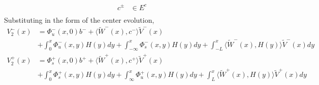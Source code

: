 \documentclass[thesis.tex]{subfiles}
\begin{document}
\begin{enumerate}
\begin{align*}
c^\pm &\in E^c \\
\end{align*}
Substituting in the form of the center evolution,
\begin{equation*}
\begin{aligned}
V_2^-(x) &= \Phi_u^-(x, 0) b^- + \langle \tilde{W}^-(x), c^- \rangle \tilde{V}^-(x) \\
&+ \int_0^x \Phi_u^-(x, y) H(y) dy + \int_{-\infty}^x \Phi_s^-(x, y) H(y) dy + \int_{-L}^x \langle \tilde{W}^-(x), H(y) \rangle \tilde{V}^-(x) dy \\ 
V_2^+(x) &= \Phi_s^+(x, 0) b^+ +  \langle \tilde{W}^+(x), c^+ \rangle \tilde{V}^+(x) \\
&+ \int_0^x \Phi_s^+(x, y)H(y) dy
+ \int_{\infty}^x \Phi_u^+(x, y)H(y) dy + \int_{L}^x \langle \tilde{W}^+(x), H(y) \rangle \tilde{V}^+(x) dy
\end{aligned}
\end{equation*}

\end{enumerate}
\end{document}
